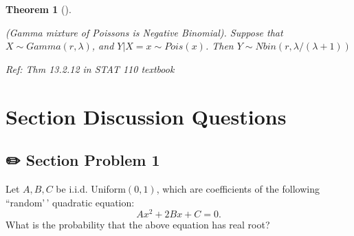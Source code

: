 \documentclass[
  letterpaper,
  DIV=11,
  numbers=noendperiod]{scrreprt}
\theoremstyle{definition}
\theoremstyle{plain}
\newtheorem{theorem}{Theorem}[chapter]
\theoremstyle{remark}
\begin{document}
\leavevmode{}%
\begin{theorem}[]\label{thm-mixture-poisson-negative-binomial}

(Gamma mixture of Poissons is Negative Binomial). Suppose that
\(X \sim Gamma(r, \lambda)\), and \(Y|X=x \sim Pois(x)\). Then
\(Y\sim Nbin(r, \lambda/(\lambda+1))\)

\emph{Ref: Thm 13.2.12 in STAT 110 textbook}

\end{theorem}

\hypertarget{section-discussion-questions}{%
\section*{Section Discussion
Questions}\label{section-discussion-questions}}


\hypertarget{section-problem-1-1}{%
\subsection*{✏️ Section Problem 1}\label{section-problem-1-1}}

Let \(A, B, C\) be i.i.d. Uniform\((0,1)\), which are coefficients of
the following ``random'\,' quadratic equation: \[
A x^2 + 2B x + C = 0.
\] What is the probability that the above equation has real root?
\end{document}
